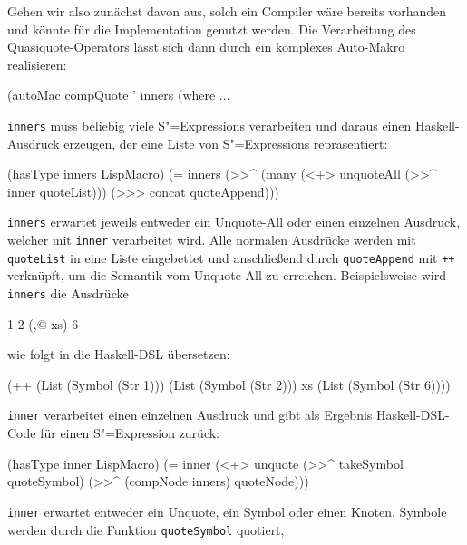 \documentclass[12pt, a4paper, bibgerm]{scrbook}
\newenvironment{DIFnomarkup}{}{}
\newcommand\icode[1]{\lstinline?#1?}
\newcommand{\sexp}{S"=Expression}
\newcommand{\sexps}{S"=Expressions}
\begin{document}
Gehen wir also zunächst davon aus, solch ein Compiler wäre bereits
vorhanden und könnte für die Implementation genutzt werden. Die
Verarbeitung des Quasiquote-Operators lässt sich dann durch ein komplexes
Auto-Makro realisieren:
\begin{DIFnomarkup}\begin{code}
(autoMac compQuote ' inners
  (where
    ...
\end{code}\end{DIFnomarkup}
\icode{inners} muss beliebig viele \sexps{} verarbeiten und daraus einen
Haskell-Ausdruck erzeugen, der eine Liste von \sexps{}
repräsentiert:
\begin{DIFnomarkup}\begin{code}
    (hasType inners LispMacro)
    (= inners
       (>>^ (many (<+> unquoteAll 
                       (>>^ inner quoteList)))
            (>>> concat quoteAppend)))
\end{code}\end{DIFnomarkup}
\icode{inners} erwartet jeweils entweder ein Unquote-All oder einen
einzelnen Ausdruck, welcher mit \icode{inner} verarbeitet wird. Alle
normalen Ausdrücke werden mit \icode{quoteList} in eine Liste
eingebettet und anschließend durch \icode{quoteAppend} mit \icode{++}
verknüpft, um die Semantik vom Unquote-All zu erreichen. Beispielsweise
wird \icode{inners} die Ausdrücke 
\begin{DIFnomarkup}\begin{code}
1 2 (,@ xs) 6  
\end{code}\end{DIFnomarkup}
wie folgt in die Haskell-DSL übersetzen:
\begin{DIFnomarkup}\begin{code}
(++ (List (Symbol (Str 1)))
    (List (Symbol (Str 2)))
    xs    
    (List (Symbol (Str 6))))
\end{code}\end{DIFnomarkup}
\icode{inner} verarbeitet einen einzelnen Ausdruck und gibt als Ergebnis
Haskell-DSL-Code für einen \sexp{} zurück:
\begin{DIFnomarkup}\begin{code}
    (hasType inner LispMacro)
    (= inner (<+> unquote    
                  (>>^ takeSymbol quoteSymbol)     
                  (>>^ (compNode inners) quoteNode)))
\end{code}\end{DIFnomarkup}
\icode{inner} erwartet entweder ein Unquote, ein Symbol oder einen
Knoten. Symbole werden durch die Funktion \icode{quoteSymbol} quotiert,
\end{document}
